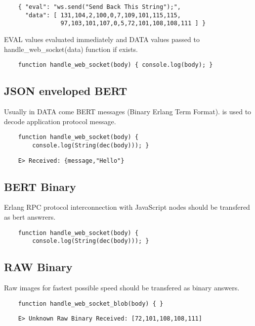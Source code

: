 \begin{lstlisting}
    { "eval": "ws.send("Send Back This String");",
      "data": [ 131,104,2,100,0,7,109,101,115,115,
                97,103,101,107,0,5,72,101,108,108,111 ] }
\end{lstlisting}

EVAL values evaluated immediately and DATA values passed
to handle\_web\_socket(data) function if exists.

\begin{lstlisting}
    function handle_web_socket(body) { console.log(body); }
\end{lstlisting}

\subsection{JSON enveloped BERT}

Usually in DATA come BERT messages (Binary Erlang Term Format).
is used to decode application protocol message.

\begin{lstlisting}
    function handle_web_socket(body) {
        console.log(String(dec(body))); }
\end{lstlisting}

\begin{lstlisting}
    E> Received: {message,"Hello"}
\end{lstlisting}

\subsection{BERT Binary}

Erlang RPC protocol interconnection with JavaScript nodes should be transfered as bert answrers.

\begin{lstlisting}
    function handle_web_socket(body) {
        console.log(String(dec(body))); }
\end{lstlisting}

\subsection{RAW Binary}

Raw images for fastest possible speed should be transfered as binary answers.

\begin{lstlisting}
    function handle_web_socket_blob(body) { }
\end{lstlisting}

\begin{lstlisting}
    E> Unknown Raw Binary Received: [72,101,108,108,111]
\end{lstlisting}
